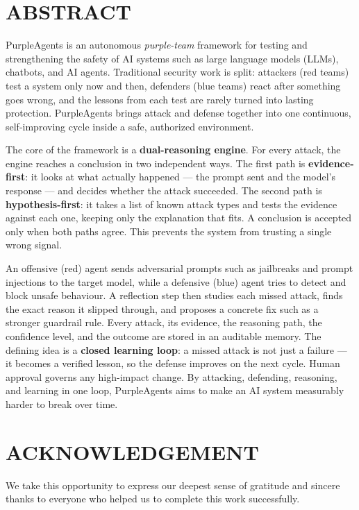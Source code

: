 \chapter*{ABSTRACT}
PurpleAgents is an autonomous \emph{purple-team} framework for testing and strengthening the safety of AI systems such as large language models (LLMs), chatbots, and AI agents. Traditional security work is split: attackers (red teams) test a system only now and then, defenders (blue teams) react after something goes wrong, and the lessons from each test are rarely turned into lasting protection. PurpleAgents brings attack and defense together into one continuous, self-improving cycle inside a safe, authorized environment.

The core of the framework is a \textbf{dual-reasoning engine}. For every attack, the engine reaches a conclusion in two independent ways. The first path is \textbf{evidence-first}: it looks at what actually happened --- the prompt sent and the model's response --- and decides whether the attack succeeded. The second path is \textbf{hypothesis-first}: it takes a list of known attack types and tests the evidence against each one, keeping only the explanation that fits. A conclusion is accepted only when both paths agree. This prevents the system from trusting a single wrong signal.

An offensive (red) agent sends adversarial prompts such as jailbreaks and prompt injections to the target model, while a defensive (blue) agent tries to detect and block unsafe behaviour. A reflection step then studies each missed attack, finds the exact reason it slipped through, and proposes a concrete fix such as a stronger guardrail rule. Every attack, its evidence, the reasoning path, the confidence level, and the outcome are stored in an auditable memory. The defining idea is a \textbf{closed learning loop}: a missed attack is not just a failure --- it becomes a verified lesson, so the defense improves on the next cycle. Human approval governs any high-impact change. By attacking, defending, reasoning, and learning in one loop, PurpleAgents aims to make an AI system measurably harder to break over time.
\clearpage

\chapter*{ACKNOWLEDGEMENT}
We take this opportunity to express our deepest sense of gratitude and sincere thanks to everyone who helped us to complete this work successfully.

